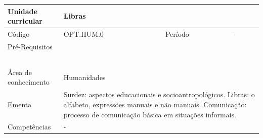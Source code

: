 \begin{quadro}[ht!]
  \centering\scriptsize
\caption{Unidade Curricular Libras}

\begin{tabular}{|p{2.5cm}|p{2.5cm}|p{2.5cm}|p{2.5cm}|p{2.5cm}|}\hline

  Unidade curricular & \multicolumn{4}{p{10cm}|}{ Libras }\\\hline
  Código & OPT.HUM.0 & Período & \multicolumn{2}{p{5cm}|}{ - }\\\hline
  Pré-Requisitos & \multicolumn{4}{p{10cm}|}{  } \\\hline
  \cellcolor{blue1}{ CH PRESENCIAL } &
    \cellcolor{blue1}{CH EAD Síncrona} &
    \cellcolor{blue1}{CH EAD Síncrona Mediada} &
    \cellcolor{blue1}{CH EAD Assíncrona} &
    \cellcolor{blue1}{CH APCC} \\\hline
  \cellcolor{blue1}{ 30 } &
    \cellcolor{blue1}{ 0 } &
    \cellcolor{blue1}{ 0 } &
    \cellcolor{blue1}{ 0 } &
    \cellcolor{blue1}{0} \\\hline
  \cellcolor{blue1}{ CH Teórica } &
    \cellcolor{blue1}{CH Prática} &
    \cellcolor{blue1}{CH Humanidades} &
    \cellcolor{blue1}{CH Extensão} &
    \cellcolor{blue1}{CH EAD TOTAL} \\\hline
  \cellcolor{blue1}{ 30 } &
    \cellcolor{blue1}{ 0 } &
    \cellcolor{blue1}{ 30 } &
    \cellcolor{blue1}{ 0 } &
    \cellcolor{blue1}{ 0 } \\\hline
  \cellcolor{blue1}{CARGA-HORÁRIA TOTAL} & \multicolumn{4}{p{10cm}|}{ \cellcolor{blue1}{ 30 } } \\\hline
  Área de conhecimento & \multicolumn{4}{p{10cm}|}{ Humanidades } \\\hline
  Ementa & \multicolumn{4}{p{10cm}|}{ Surdez: aspectos educacionais e socioantropológicos. Libras: o alfabeto, expressões manuais e não manuais. Comunicação: processo de comunicação básica em situações informais. } \\\hline
  Competências & \multicolumn{4}{p{10cm}|}{ - } \\\hline


  
	\end{tabular}

\end{quadro}


\clearpage
\newpage

